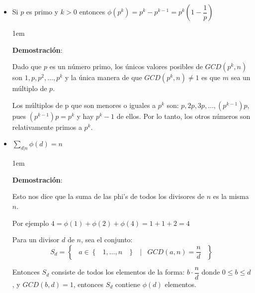 \documentclass[12pt, fleqn]{report}                             %
\newenvironment{SmallIndentation}[1][0.75em]                    %
    {\begin{adjustwidth}{#1}{}\begin{footnotesize}}                 %
    {\end{footnotesize}\end{adjustwidth}}                           %
\DeclareMathOperator \Space {\quad}                             %
\DeclareMathOperator \MiniSpace {\;}                            %
\newcommand \Such {\MiniSpace|\MiniSpace}                       %
\newcommand{\Set}[1]{\left\{ \MiniSpace #1 \MiniSpace \right\}} %
\newcommand{\Wrap}[1]{\left( #1 \right)}                        %
\begin{document}
\begin{itemize}
\begin{SmallIndentation}[1em]
                    \end{SmallIndentation}


                \item Si $p$ es primo y $k > 0$ entonces
                    $\phi(p^k) = p^k - p^{k-1} = p^k\Wrap{1 - \dfrac{1}{p}}$

                    \begin{SmallIndentation}[1em]
                        \textbf{Demostración}:

                        Dado que $p$ es un número primo, los únicos valores posibles de
                        $GCD(p^k, n)$ son $1, p, p^2, \dots, p^k$ y la única manera de que
                        $GCD(p^k, n) \neq 1$ es que $m$ sea un múltiplo de $p$.

                        Los múltiplos de p que son menores o iguales a $p^k$ son:
                        $p, 2p, 3p, \dots , (p^{k-1})p$, pues $(p^{k-1})p = p^k$
                        y hay $p^k -1$ de ellos.
                        Por lo tanto, los otros números son relativamente primos a $p^k$.

                    \end{SmallIndentation}


                \clearpage

                \item $\sum\limits_{d | n} \phi(d) = n$
                    \begin{SmallIndentation}[1em]
                        \textbf{Demostración}:

                        Esto nos dice que la suma de las phi's de todos los divisores
                        de $n$ es la misma $n$.

                        Por ejemplo $4 = \phi(1) + \phi(2) + \phi(4) = 1 + 1 + 2 = 4$

                        Para un divisor $d$ de $n$, sea el conjunto:
                        \begin{equation*}
                            S_d = \Set{ a \in \Set{1, \dots, n} \Such GCD(a, n) = \dfrac{n}{d}}  
                        \end{equation*}

                        Entonces $S_d$ consiste de todos los elementos de la forma:
                        $b \cdot \dfrac{n}{d}$ donde $0 \leq b \leq d$, y $GCD(b,d) = 1$,
                        entonces $S_d$ contiene $\phi(d)$ elementos.


\end{SmallIndentation}
\end{itemize}
\end{document}

